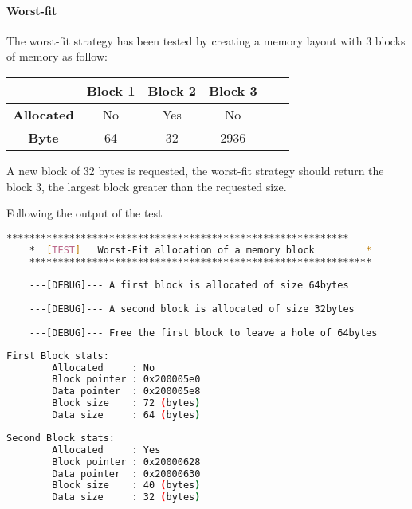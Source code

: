     \paragraph{Worst-fit} The worst-fit strategy has been tested by creating a memory layout with 3 blocks of memory as follow:

    \begin{table}[h]
    \centering
    \begin{tabular}{|c|c|c|c|c|c|}
    \hline
    & \textbf{Block 1} & \textbf{Block 2} & \textbf{Block 3} \\
    \hline
    \textbf{Allocated} & No & Yes & No \\
    \textbf{Byte} & 64 & 32 & 2936 \\
    \hline
    \end{tabular}
    \end{table}

    A new block of 32 bytes is requested, the worst-fit strategy should return the block 3, the largest block greater than the requested size.

    Following the output of the test

    \begin{outputbox}
    \begin{lstlisting}[language=bash]
    ************************************************************
    *  [TEST]   Worst-Fit allocation of a memory block         *
    ************************************************************
    
    ---[DEBUG]--- A first block is allocated of size 64bytes
    
    ---[DEBUG]--- A second block is allocated of size 32bytes
    
    ---[DEBUG]--- Free the first block to leave a hole of 64bytes
    \end{lstlisting}
    \end{outputbox}
    
    \begin{outputbox}
    \begin{lstlisting}[language=bash]
    First Block stats:
        Allocated     : No
        Block pointer : 0x200005e0
        Data pointer  : 0x200005e8
        Block size    : 72 (bytes)
        Data size     : 64 (bytes)
    \end{lstlisting}
    \end{outputbox}
    
    \begin{outputbox}
    \begin{lstlisting}[language=bash]
    Second Block stats:
        Allocated     : Yes
        Block pointer : 0x20000628
        Data pointer  : 0x20000630
        Block size    : 40 (bytes)
        Data size     : 32 (bytes)
    \end{lstlisting}
    \end{outputbox}
    
